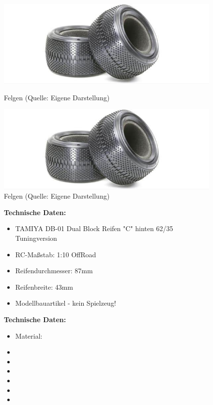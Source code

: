 \begin{figure}[htb]
	\centering
	\begin{minipage}{0.45\linewidth}
		\centering
		\includegraphics[scale=0.5]{images/reifen.png}
		\caption{Felgen \newline (Quelle: Eigene Darstellung)}
	\end{minipage}
	\begin{minipage}{0.45\linewidth}
		\centering
		\includegraphics[scale=0.5]{images/reifen.png}
		\caption{Felgen \newline (Quelle: Eigene Darstellung)}
	\end{minipage}
\end{figure}


\begin{figure}[htb]
	\centering
	\begin{minipage}{0.4\linewidth}
		\textbf{Technische Daten:}
		\begin{itemize}
			\item TAMIYA DB-01 Dual Block Reifen "C" hinten 62/35 Tuningversion
			\item RC-Maßstab:  1:10 OffRoad
			\item Reifendurchmesser: 87mm
			\item Reifenbreite: 43mm
			\item Modellbauartikel - kein Spielzeug!
		\end{itemize}
	\end{minipage}
	\begin{minipage}[h]{0.4\textwidth}
		\textbf{Technische Daten:}
		\begin{itemize}
			\item Material:
			\item
			\item
			\item
			\item
			\item
			\item
		\end{itemize}
	\end{minipage}
\end{figure}

